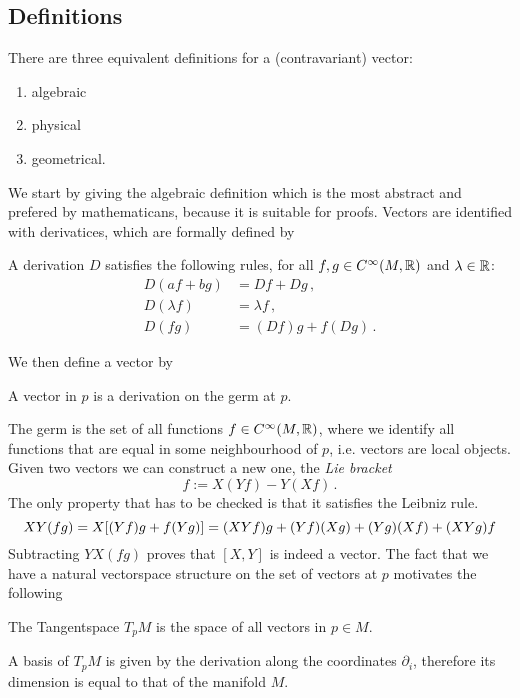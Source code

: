 \subsection{Definitions}
There are three equivalent definitions for a
(contravariant) vector:
\begin{enumerate}
    \item algebraic 
    \item physical
    \item geometrical.
\end{enumerate}
We start by giving the algebraic definition which is the most
abstract and prefered by mathematicans, because it is suitable for proofs.
Vectors are identified with derivatices, which are formally defined by
\begin{definition}[Derivation]
A derivation $D$ satisfies the following rules, for all $f,g\in
C^\infty(M,\mathbb{R})$ and $\lambda \in \mathbb{R}$:
\begin{align}
    D(af+bg) &=Df+Dg\,,\\
    D(\lambda f)&=\lambda f\,,\\
    D(fg)&= (Df)g+f(Dg)\,.
\end{align}
\end{definition}
We then define a vector by 
\begin{definition} A vector in $p$ is a derivation on the germ at $p$.
\end{definition}
The germ is the set of all functions $f\in C^\infty(M,\mathbb{R})$, where we
identify all functions that are equal in some neighbourhood of $p$, i.e. vectors are local objects.
Given two vectors we can construct a new one, the \emph{Lie bracket}
\begin{equation}
    [X,Y]f:=X(Yf)-Y(Xf)\, .\label{eq:LieBraket}
\end{equation}
The only property that has to be checked is that it satisfies the Leibniz rule.
\begin{equation}
    XY(fg)=X[(Yf)g+f(Yg)]=(XYf)g+(Yf)(Xg)+(Yg)(Xf)+(XYg)f\\
\end{equation}
Subtracting $YX(fg)$ proves that $[X,Y]$ is indeed a vector. The fact that we
have a natural vectorspace structure on the set of vectors at $p$ motivates the
following
\begin{definition}
The Tangentspace $T_pM$ is the space of all vectors in $p\in M$.
\end{definition}
A basis of $T_pM$ is given by the derivation along the
coordinates $\partial_i$, therefore its dimension is equal to that of the manifold $M$.
